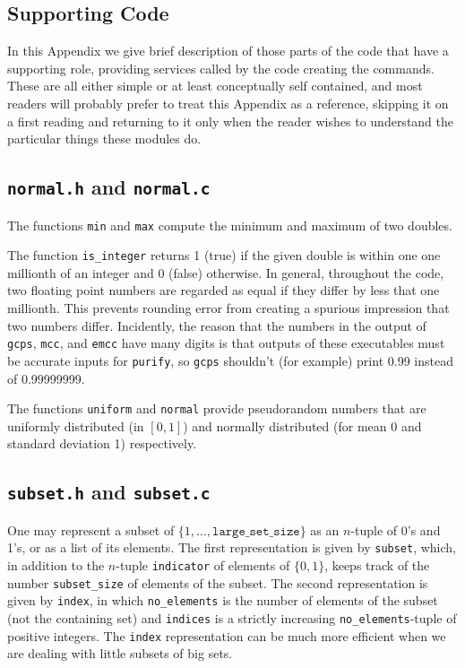 \documentclass[12pt]{article}
\theoremstyle{definition}
\begin{document}
\begin{appendix}
\section{Supporting Code}

In this Appendix we give brief description of those parts of the code
that have a supporting role, providing services called by the code
creating the commands.  These are all either simple or at least
conceptually self contained, and most readers will probably prefer to
treat this Appendix as a reference, skipping it on a first reading and
returning to it only when the reader wishes to understand the
particular things these modules do.

\subsection{\texttt{normal.h} and \texttt{normal.c}}

The functions \texttt{min} and \texttt{max} compute the minimum and
maximum of two doubles.

The function \texttt{is\_integer} returns 1 (true) if the given double
is within one one millionth of an integer and 0 (false) otherwise.  In
general, throughout the code, two floating point numbers are regarded
as equal if they differ by less that one millionth.  This prevents
rounding error from creating a spurious impression that two numbers
differ.  Incidently, the reason that the numbers in the output of
\texttt{gcps}, \texttt{mcc}, and \texttt{emcc} have many digits is
that outputs of these executables must be accurate inputs for
\texttt{purify}, so \texttt{gcps} shouldn't (for example) print 0.99
instead of 0.99999999.

The functions \texttt{uniform} and \texttt{normal} provide
pseudorandom numbers that are uniformly distributed (in $[0,1]$) and
normally distributed (for mean 0 and standard deviation 1)
respectively.  

\subsection{\texttt{subset.h}  and \texttt{subset.c}}

One may represent a subset of $\{1, \ldots,
\mathtt{large\_set\_size}\}$ as an $n$-tuple of 0's and 1's, or as a
list of its elements.  The first representation is given by
\texttt{subset}, which, in addition to the $n$-tuple
\texttt{indicator} of elements of $\{0,1\}$, keeps track of the number
\texttt{subset\_size} of elements of the subset.  The second
representation is given by \texttt{index}, in which
\texttt{no\_elements} is the number of elements of the subset (not the
containing set) and \texttt{indices} is a strictly increasing
\texttt{no\_elements}-tuple of positive integers.  The \texttt{index}
representation can be much more efficient when we are dealing with
little subsets of big sets.


\end{appendix}
\end{document}
